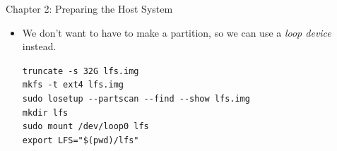 \documentclass[aspectratio=169]{beamer}
\begin{document}
\begin{frame}{Chapter 2: Preparing the Host System}
	\begin{itemize}
		\item We don't want to have to make a partition, so we can use a \textit{loop device} instead.

		      \vspace{1em}

		      \texttt{truncate -s 32G lfs.img} \\
		      \texttt{mkfs -t ext4 lfs.img} \\
		      \texttt{sudo losetup -{}-partscan -{}-find -{}-show lfs.img} \\
		      \texttt{mkdir lfs} \\
		      \texttt{sudo mount /dev/loop0 lfs} \\
		      \texttt{export LFS="\$(pwd)/lfs"}
	\end{itemize}
\end{frame}
\end{document}
